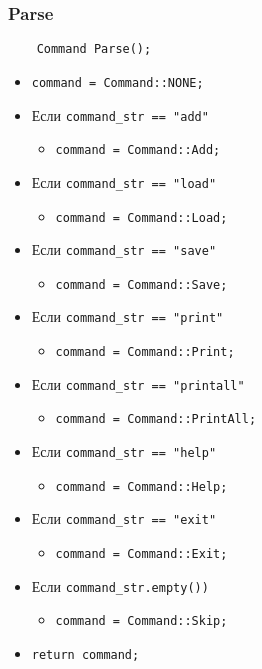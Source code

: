 \subsubsection*{Parse}

\begin{lstlisting}
	Command Parse();
\end{lstlisting}

\begin{itemize}
	\item \verb|command = Command::NONE;|
	\item Если \verb|command_str == "add"|
		\begin{itemize}
			\item \verb|command = Command::Add;|
		\end{itemize}
	\item Если \verb|command_str == "load"|
		\begin{itemize}
			\item \verb|command = Command::Load;|
		\end{itemize}
	\item Если \verb|command_str == "save"|
		\begin{itemize}
			\item \verb|command = Command::Save;|
		\end{itemize}
	\item Если \verb|command_str == "print"|
		\begin{itemize}
			\item \verb|command = Command::Print;|
		\end{itemize}
	\item Если \verb|command_str == "printall"|
		\begin{itemize}
			\item \verb|command = Command::PrintAll;|
		\end{itemize}
	\item Если \verb|command_str == "help"|
		\begin{itemize}
			\item \verb|command = Command::Help;|
		\end{itemize}
	\item Если \verb|command_str == "exit"|
		\begin{itemize}
			\item \verb|command = Command::Exit;|
		\end{itemize}
	\item Если \verb|command_str.empty())|
		\begin{itemize}
			\item \verb|command = Command::Skip;|
		\end{itemize}
	\item \verb|return command;|
\end{itemize}


